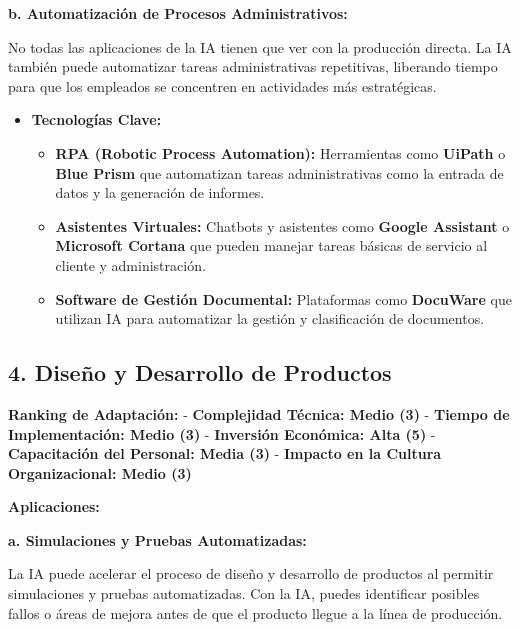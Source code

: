 \documentclass[
  letterpaper,
]{book}
\providecommand{\tightlist}{%
  \setlength{\itemsep}{0pt}\setlength{\parskip}{0pt}}\usepackage{longtable,booktabs,array}
\begin{document}
\textbf{b. Automatización de Procesos Administrativos:}

No todas las aplicaciones de la IA tienen que ver con la producción
directa. La IA también puede automatizar tareas administrativas
repetitivas, liberando tiempo para que los empleados se concentren en
actividades más estratégicas.

\begin{itemize}
\tightlist
\item
  \textbf{Tecnologías Clave:}

  \begin{itemize}
  \tightlist
  \item
    \textbf{RPA (Robotic Process Automation):} Herramientas como
    \textbf{UiPath} o \textbf{Blue Prism} que automatizan tareas
    administrativas como la entrada de datos y la generación de
    informes.
  \item
    \textbf{Asistentes Virtuales:} Chatbots y asistentes como
    \textbf{Google Assistant} o \textbf{Microsoft Cortana} que pueden
    manejar tareas básicas de servicio al cliente y administración.
  \item
    \textbf{Software de Gestión Documental:} Plataformas como
    \textbf{DocuWare} que utilizan IA para automatizar la gestión y
    clasificación de documentos.
  \end{itemize}
\end{itemize}

\subsection{\texorpdfstring{4. \textbf{Diseño y Desarrollo de
Productos}}{4. Diseño y Desarrollo de Productos}}\label{diseuxf1o-y-desarrollo-de-productos}

\textbf{Ranking de Adaptación:} - \textbf{Complejidad Técnica: Medio
(3)} - \textbf{Tiempo de Implementación: Medio (3)} - \textbf{Inversión
Económica: Alta (5)} - \textbf{Capacitación del Personal: Media (3)} -
\textbf{Impacto en la Cultura Organizacional: Medio (3)}

\textbf{Aplicaciones:}

\textbf{a. Simulaciones y Pruebas Automatizadas:}

La IA puede acelerar el proceso de diseño y desarrollo de productos al
permitir simulaciones y pruebas automatizadas. Con la IA, puedes
identificar posibles fallos o áreas de mejora antes de que el producto
llegue a la línea de producción.
\end{document}
